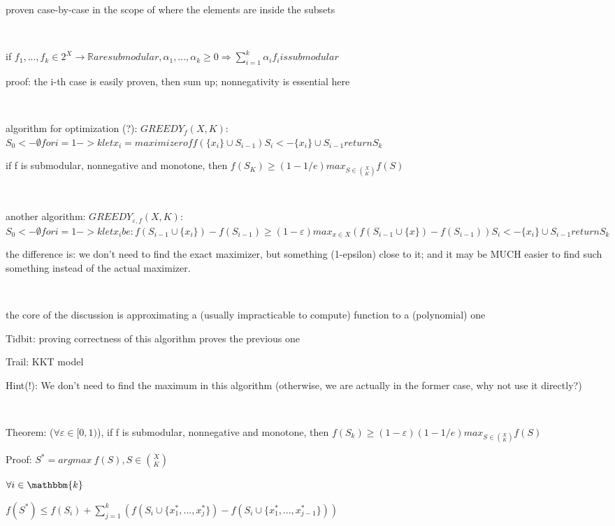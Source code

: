 \documentclass{report}
\begin{document}
	proven case-by-case in the scope of where the elements are inside the subsets
	
	\
	
	if $f_1, ..., f_k \in 2^X \to \mathbb{R} are submodular, \alpha_1, ..., \alpha_k \geq 0 \Rightarrow \sum_{i=1}^{k}\alpha_i f_i is submodular$
	
	proof: the i-th case is easily proven, then sum up; nonnegativity is essential here
	
	\
	
	algorithm for optimization (?): $GREEDY_f(X, K)$:
	$
	S_0 <- \emptyset
	for i=1 -> k
		let x_i = maximizer of f(\{x_i\} \cup S_{i-1})
		S_i <- \{x_i\} \cup S_{i-1}		
	return S_k
	$
	
	if f is submodular, nonnegative and monotone, then $\displaystyle f(S_K)\geq(1-1/e)max_{S \in \binom{X}{K}}f(S)$
	
	\
	
	another algorithm: $GREEDY_{\varepsilon, f}(X, K)$:
	$
	S_0 <- \emptyset
	for i=1 -> k
		let x_i be : f(S_{i-1} \cup \{x_i\}) - f(S_{i-1}) \geq (1-\varepsilon)max_{x \in X} (f(S_{i-1} \cup \{x\}) - f(S_{i-1})) %
		S_i <- \{x_i\} \cup S_{i-1}		
	return S_k
	$
	
	the difference is: we don't need to find the exact maximizer, but something (1-epsilon) close to it; and it may be MUCH easier to find such something instead of the actual maximizer.
	
	\
	
	the core of the discussion is approximating a (usually impracticable to compute) function to a (polynomial) one
	
	Tidbit: proving correctness of this algorithm proves the previous one
	
	Trail: KKT model
	
	Hint(!): We don't need to find the maximum in this algorithm (otherwise, we are actually in the former case, why not use it directly?)
	
	\
	
	Theorem: ($\forall \varepsilon \in [0, 1)$), if f is submodular, nonnegative and monotone, then $f(S_k) \geq (1-\varepsilon)(1-1/e)max_{S \in \binom{X}{K}}f(S)$

	Proof: $S^* = argmax\ f(S), S \in \binom{X}{K}$
	
	$\forall i \in \mathbbm{k}$
	
	$f(S^*) \leq f(S_i) + \sum_{j=1}^{k}(f(S_i \cup\{x_1^*, ..., x_j^*\})-f(S_i \cup\{x_1^*, ..., x_{j-1}^*\}))$
	
\end{document}
